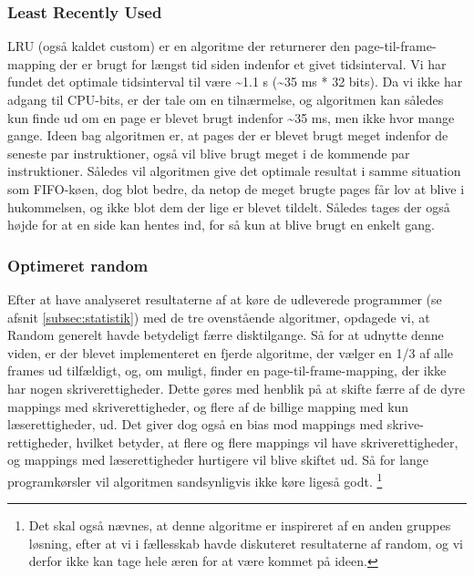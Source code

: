 	\subsubsection{Least Recently Used}
	LRU (også kaldet custom) er en algoritme der returnerer den page-til-frame-mapping der er brugt for længst tid siden indenfor et givet tidsinterval.  Vi har fundet det optimale tidsinterval til være \textasciitilde1.1 s (\textasciitilde35 ms * 32 bits). Da vi ikke har adgang til CPU-bits, er der tale om en tilnærmelse, og algoritmen kan således kun finde ud om en page er blevet brugt indenfor \textasciitilde35 ms, men ikke hvor mange gange. Ideen bag algoritmen er, at pages der er blevet brugt meget indenfor de seneste par instruktioner, også vil blive brugt meget i de kommende par instruktioner. Således vil algoritmen give det optimale resultat i samme situation som FIFO-køen, dog blot bedre, da netop de meget brugte pages får lov at blive i hukommelsen, og ikke blot dem der lige er blevet tildelt. Således tages der også højde for at en side kan hentes ind, for så kun at blive brugt en enkelt gang.

	\subsubsection{Optimeret random}
	Efter at have analyseret resultaterne af at køre de udleverede programmer (se afsnit \ref{subsec:statistik}) med de tre ovenstående algoritmer, opdagede vi, at Random generelt havde betydeligt færre disktilgange. Så for at udnytte denne viden, er der blevet implementeret en fjerde algoritme, der vælger en 1/3 af alle frames ud tilfældigt, og, om muligt, finder en page-til-frame-mapping, der ikke har nogen skriverettigheder. Dette gøres med henblik på at skifte færre af de dyre mappings med skriverettigheder, og flere af de billige mapping med kun læserettigheder, ud. Det giver dog også en bias mod mappings med skrive-rettigheder, hvilket betyder, at flere og flere mappings vil have skriverettigheder, og mappings med læserettigheder hurtigere vil blive skiftet ud. Så for lange programkørsler vil algoritmen sandsynligvis ikke køre ligeså godt. \footnote{Det skal også nævnes, at denne algoritme er inspireret af en anden gruppes løsning, efter at vi i fællesskab havde diskuteret resultaterne af random, og vi derfor ikke kan tage hele æren for at være kommet på ideen.}
